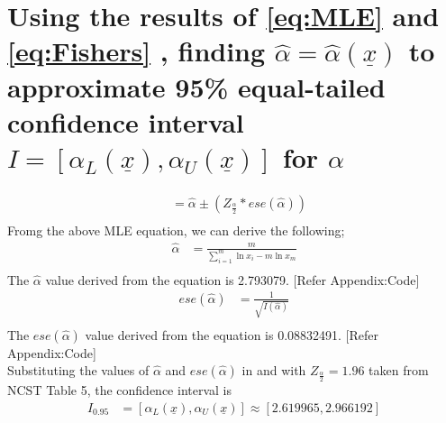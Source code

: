 \documentclass[11pt]{article}
\begin{document}
\section{Using the results of \ref{eq:MLE} and \ref{eq:Fishers} , finding  $\hat{\alpha}=\hat{\alpha}(\underline x)$ to approximate 95\% equal-tailed confidence interval $I=[\alpha_{L}(\underline x),\alpha_{U}(\underline x)]$ for $\alpha$}
\begin{align*}
[\alpha_{L}(\underline x),\alpha_{U}(\underline x)] &= {\hat{\alpha}}\pm({Z_{\frac{\alpha}{2}} * ese(\hat{\alpha})}) \\
\end{align*}
Fromg the above MLE equation, we can derive the following;
\begin{align*}
\hat{\alpha} &= {\frac{m}{\sum_{i=1}^{m}\ln x_i - m\ln{x_m}}}\\
\end{align*}
The $\hat{\alpha}$ value derived from the equation is 2.793079. [Refer Appendix:Code]
\begin{align*}
ese(\hat{\alpha}) &= \frac{1}{\sqrt{I(\hat{\alpha})}}\\
\end{align*}
The $ese(\hat{\alpha})$ value derived from the equation is 0.08832491. [Refer Appendix:Code]\\
Substituting the values of $\hat\alpha$ and $ese(\hat\alpha)$ in  and with $Z_{\frac{\alpha}{2}} = 1.96$ taken from NCST Table 5, the confidence interval is
\begin{align*}
I_{0.95} &= [\alpha_{L}(\underline x),\alpha_{U}(\underline x)] \approx [ 2.619965 , 2.966192 ]
\end{align*}
 
\end{document}
